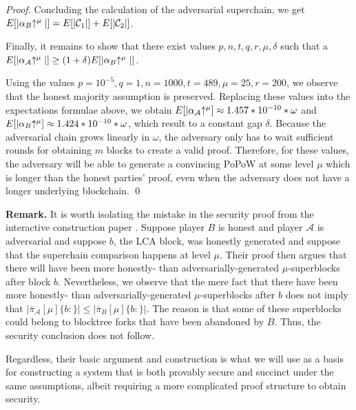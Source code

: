 \begin{proof}
Concluding the calculation of the adversarial superchain, we get
$E[|\alpha_B\negthickspace\uparrow^\mu|] = E[|\mathcal{C}_1|] + E[|\mathcal{C}_2|]$.

Finally, it remains to show that there exist values $p, n, t, q, r, \mu, \delta$
such that a $E[|\alpha_\mathcal{A}\negthickspace\uparrow^\mu|] \geq (1 +
\delta)E[|\alpha_B\negthickspace\uparrow^\mu|]$.

Using the values $p = 10^{-5}, q = 1, n =
1000, t = 489, \mu = 25, r = 200$, we observe that the honest majority
assumption is preserved. Replacing these values into the expectations formulae
above, we obtain $E[|\alpha_\mathcal{A}\negthickspace\uparrow^\mu] \approx 1.457 * 10^{-10} *
\omega$ and $E[|\alpha_B\negthickspace\uparrow^\mu] \approx 1.424 * 10^{-10} * \omega$, which
result to a constant gap $\delta$. Because the adversarial chain grows linearly
in $\omega$, the adversary only has to wait sufficient rounds for obtaining $m$
blocks to create a valid proof. Therefore, for these values, the adversary
will be able to generate a convincing PoPoW at some level $\mu$ which is longer
than the honest parties' proof, even when the adversary does not have a longer
underlying blockchain.
\qed
\end{proof}

\textbf{Remark.} It is worth isolating the mistake in the security proof from
the interactive construction paper \cite{KLS}. Suppose player $B$ is honest and
player $\mathcal{A}$ is adversarial and suppose $b$, the LCA block, was honestly
generated and suppose that the superchain comparison happens at level $\mu$.
Their proof then argues that there will have been more honestly- than
adversarially-generated $\mu$-superblocks after block $b$. Nevertheless, we
observe that the mere fact that there have been more honestly- than
adversarially-generated $\mu$-superblocks after $b$ does not imply that
$|\overline\pi_\mathcal{A}[\mu]\{b:\}| \leq |\overline\pi_B[\mu]\{b:\}|$. The
reason is that some of these superblocks could belong to blocktree forks that
have been abandoned by $B$. Thus, the security conclusion does not follow.

Regardless, their basic argument and construction is what we will use as a basis
for constructing a system that is both provably secure and succinct under the
same assumptions, albeit requiring a more complicated proof structure to obtain
security.
